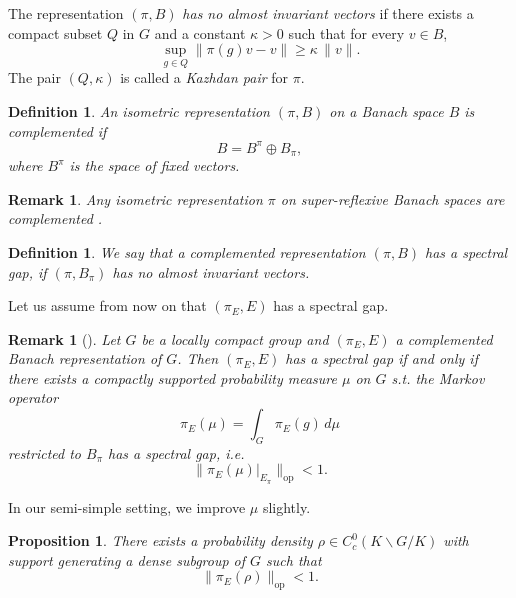 \documentclass[12pt]{amsart}
\newtheorem{proposition}[theorem]{Proposition}
\newtheorem{definition}[theorem]{Definition}
\newtheorem{remark}[theorem]{Remark}
\theoremstyle{definition}
\begin{document}
The representation \((\pi,B)\) \emph{has no almost invariant vectors} if
there exists a compact subset \(Q\) in \(G\) and a constant \(\kappa>0\)
such that for every \(v \in B\),
\[\sup _{g \in Q}\left\|\pi(g)v- v\right\| \geq \kappa \,\|v\| .\] The
pair \((Q, \kappa)\) is called a \emph{Kazhdan pair} for \(\pi\).


\begin{definition}
An isometric representation \((\pi,B)\) on a Banach space \(B\) is
\emph{complemented} if \[B=B^\pi \oplus B_\pi,\] where \(B^{\pi}\) is
the space of fixed vectors.
\end{definition}

\begin{remark}
\label{1e3f00}
Any isometric representation \(\pi\) on super-reflexive Banach spaces are complemented \cite[Proposition~2.6]{Bader2007}.
\end{remark}

\begin{definition}
\label{3ad315}
We say that a complemented representation \((\pi,B)\) \emph{has a
spectral gap}, if \((\pi,B_{\pi})\) has no almost invariant vectors.
\end{definition}

Let us assume from now on that \((\pi_{E},E)\) has a spectral gap.


\begin{remark}[{\cite[Theorem~1.1]{Drutu2019}}]
\label{343c7b}
Let \(G\) be a locally compact group and \((\pi_E,E)\) a complemented
Banach representation of \(G\). Then \((\pi_E,E)\) has a spectral gap if
and only if there exists a compactly supported probability measure
\(\mu\) on \(G\) s.t. the Markov operator
\[\pi_E(\mu) = \int_{G} \pi_E(g) \, d\mu\] restricted to \(B_{\pi}\) has a
spectral gap, i.e. \[\|\pi_E(\mu)|_{E_{\pi}}\|_{\mathrm{op}} < 1.\]
\end{remark}

In our semi-simple setting, we improve \(\mu\) slightly.


\begin{proposition}
\label{5c6adf}
There exists a probability density
\(\rho \in C^{0}_{c}(K\backslash G/K)\) with support generating a dense
subgroup of \(G\) such that \[\|\pi_{E}(\rho)\|_{\mathrm{op}}<1.\]
\end{proposition}
\end{document}
